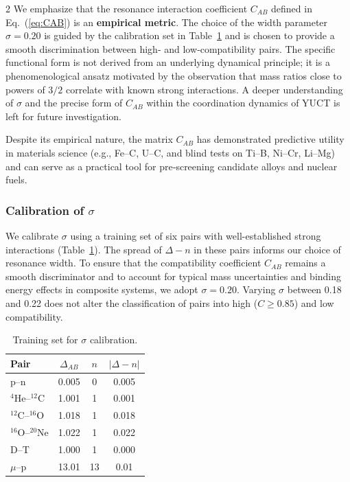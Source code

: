 \documentclass[11pt,a4paper]{article}
\begin{document}
\begin{multicols}{2}
		We emphasize that the resonance interaction coefficient \(C_{AB}\) defined in Eq.~(\ref{eq:CAB}) is an \textbf{empirical metric}. The choice of the width parameter \(\sigma = 0.20\) is guided by the calibration set in Table~\ref{tab:calibration} and is chosen to provide a smooth discrimination between high‑ and low‑compatibility pairs. The specific functional form is not derived from an underlying dynamical principle; it is a phenomenological ansatz motivated by the observation that mass ratios close to powers of \(3/2\) correlate with known strong interactions. A deeper understanding of \(\sigma\) and the precise form of \(C_{AB}\) within the coordination dynamics of YUCT is left for future investigation.
		
		Despite its empirical nature, the matrix \(C_{AB}\) has demonstrated predictive utility in materials science (e.g., Fe–C, U–C, and blind tests on Ti–B, Ni–Cr, Li–Mg) and can serve as a practical tool for pre‑screening candidate alloys and nuclear fuels.
		
		\subsubsection{Calibration of \(\sigma\)}
		
		We calibrate \(\sigma\) using a training set of six pairs with well-established strong interactions (Table~\ref{tab:calibration}). The spread of \(\Delta - n\) in these pairs informs our choice of resonance width. To ensure that the compatibility coefficient \(C_{AB}\) remains a smooth discriminator and to account for typical mass uncertainties and binding energy effects in composite systems, we adopt \(\sigma = 0.20\). Varying \(\sigma\) between 0.18 and 0.22 does not alter the classification of pairs into high (\(C \ge 0.85\)) and low compatibility.
		
		\begin{table}[H]
			\centering
			\caption{Training set for \(\sigma\) calibration.}
			\label{tab:calibration}
			\small
			\begin{tabular}{l c c c}
				\toprule
				Pair & \(\Delta_{AB}\) & \(n\) & \(|\Delta - n|\) \\
				\midrule
				p--n    & 0.005 & 0 & 0.005 \\
				\(^4\)He--\(^{12}\)C & 1.001 & 1 & 0.001 \\
				\(^{12}\)C--\(^{16}\)O & 1.018 & 1 & 0.018 \\
				\(^{16}\)O--\(^{20}\)Ne & 1.022 & 1 & 0.022 \\
				D--T    & 1.000 & 1 & 0.000 \\
				\(\mu\)--p & 13.01 & 13 & 0.01 \\
				\bottomrule
			\end{tabular}
		\end{table}
		
	\end{multicols}
	
\end{document}
